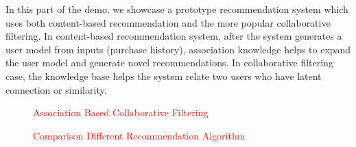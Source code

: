 
In this part of the demo, we showcase a prototype recommendation system
which uses both content-based recommendation and the more popular
collaborative filtering.
In content-based recommendation system, after the system generates a
user model from inputs (purchase history), association knowledge helps to
expand the user model and generate novel recommendations.
In collaborative filtering case, the knowledge base helps the system
relate two users who have latent connection or similarity.

\begin{figure}[th]
\centering
{}
\caption{\textcolor{red}{Association Based Collaborative Filtering}}
\label{fig:rec_result}
\shrink
\end{figure}

\begin{figure}[th]
\centering
{}
\caption{\textcolor{red}{Comparison Different Recommendation Algorithm}}
\label{fig:rec_compare}
\shrink
\end{figure}



